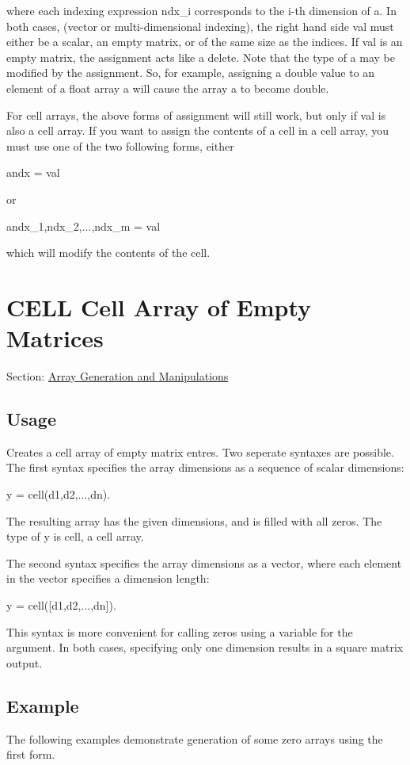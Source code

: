  where each indexing expression {\ttfamily ndx\-\_\-i} corresponds to the {\ttfamily i-\/th} dimension of {\ttfamily a}. In both cases, (vector or multi-\/dimensional indexing), the right hand side {\ttfamily val} must either be a scalar, an empty matrix, or of the same size as the indices. If {\ttfamily val} is an empty matrix, the assignment acts like a delete. Note that the type of {\ttfamily a} may be modified by the assignment. So, for example, assigning a {\ttfamily double} value to an element of a {\ttfamily float} array {\ttfamily a} will cause the array {\ttfamily a} to become {\ttfamily double}.

For cell arrays, the above forms of assignment will still work, but only if {\ttfamily val} is also a cell array. If you want to assign the contents of a cell in a cell array, you must use one of the two following forms, either \begin{DoxyVerb}  a{ndx} = val
\end{DoxyVerb}
 or \begin{DoxyVerb}  a{ndx_1,ndx_2,...,ndx_m} = val
\end{DoxyVerb}
 which will modify the contents of the cell. \hypertarget{array_cell}{}\section{C\-E\-L\-L Cell Array of Empty Matrices}\label{array_cell}
Section\-: \hyperlink{sec_array}{Array Generation and Manipulations} \hypertarget{vtkwidgets_vtkxyplotwidget_Usage}{}\subsection{Usage}\label{vtkwidgets_vtkxyplotwidget_Usage}
Creates a cell array of empty matrix entres. Two seperate syntaxes are possible. The first syntax specifies the array dimensions as a sequence of scalar dimensions\-: \begin{DoxyVerb}   y = cell(d1,d2,...,dn).
\end{DoxyVerb}
 The resulting array has the given dimensions, and is filled with all zeros. The type of {\ttfamily y} is {\ttfamily cell}, a cell array.

The second syntax specifies the array dimensions as a vector, where each element in the vector specifies a dimension length\-: \begin{DoxyVerb}   y = cell([d1,d2,...,dn]).
\end{DoxyVerb}
 This syntax is more convenient for calling {\ttfamily zeros} using a variable for the argument. In both cases, specifying only one dimension results in a square matrix output. \hypertarget{variables_struct_Example}{}\subsection{Example}\label{variables_struct_Example}
The following examples demonstrate generation of some zero arrays using the first form.


